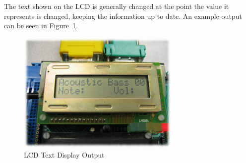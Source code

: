 The text shown on the LCD is generally changed at the point the value it represents is changed, 
keeping the information up to date.  An example output can be seen in Figure~\ref{fig:lcd}.

\begin{figure}[htb]
\centering
\includegraphics[width=0.7\textwidth]{images/lcd}
\caption{LCD Text Display Output}\label{fig:lcd}
\end{figure}
